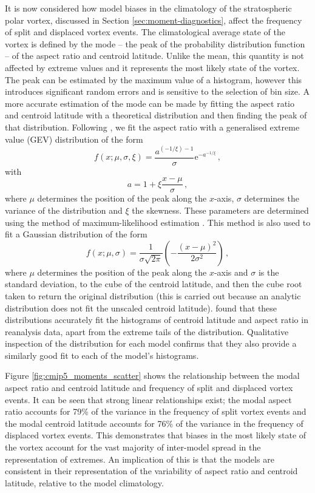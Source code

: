 \bigskip It is now considered how model biases in the climatology of the
stratospheric polar vortex, discussed in Section \ref{sec:moment-diagnostics},
affect the frequency of split and displaced vortex events. The climatological
average state of the vortex is defined by the mode -- the peak of the
probability distribution function -- of the aspect ratio and centroid
latitude. Unlike the mean, this quantity is not affected by extreme values and
it represents the most likely state of the vortex. The peak can be estimated by
the maximum value of a histogram, however this introduces significant random
errors and is sensitive to the selection of bin size. A more accurate estimation
of the mode can be made by fitting the aspect ratio and centroid latitude with a
theoretical distribution and then finding the peak of that
distribution. Following \citet{Mitchell2011}, we fit the aspect ratio with a
generalised extreme value (GEV) distribution of the form
\begin{equation}
  f(x;\mu,\sigma,\xi) = \frac{a^{(-1/\xi)-1}}{\sigma}\mathrm{e}^{{-a}^{-1/\xi}}
  \, , 
\end{equation}
with
\begin{equation} 
a = 1 + \xi \frac{x-\mu}{\sigma} \, ,
\end{equation}
where $\mu$ determines the position of the peak along the $x$-axis, $\sigma$
determines the variance of the distribution and $\xi$ the skewness. These
parameters are determined using the method of maximum-likelihood estimation
\citep{Wilks}. This method is also used to fit a Gaussian distribution of the
form
\begin{equation}
f(x;\mu,\sigma) = \frac{1}{\sigma\sqrt{2\pi}} \left(
  -\frac{(x-\mu)^2}{2\sigma^{2}} \right) \, ,
\end{equation}
where $\mu$ determines the position of the peak along the $x$-axis and $\sigma$
is the standard deviation, to the cube of the centroid latitude, and then the
cube root taken to return the original distribution (this is carried out because
an analytic distribution does not fit the unscaled centroid
latitude). \citet{Mitchell2011} found that these distributions accurately fit
the histograms of centroid latitude and aspect ratio in reanalysis data, apart
from the extreme tails of the distribution. Qualitative inspection of the
distribution for each model confirms that they also provide a similarly good fit
to each of the model's histograms.

Figure \ref{fig:cmip5_moments_scatter} shows the relationship between the modal
aspect ratio and centroid latitude and frequency of split and displaced vortex
events. It can be seen that strong linear relationships exist; the modal aspect
ratio accounts for 79\% of the variance in the frequency of split vortex events
and the modal centroid latitude accounts for 76\% of the variance in the
frequency of displaced vortex events. This demonstrates that biases in the most
likely state of the vortex account for the vast majority of inter-model spread
in the representation of extremes. An implication of this is that the models are
consistent in their representation of the variability of aspect ratio and
centroid latitude, relative to the model climatology.

